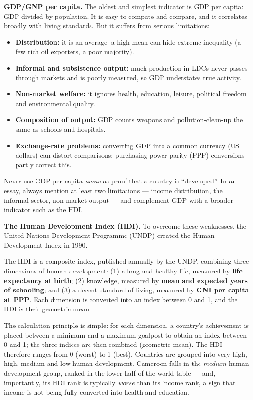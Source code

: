 \documentclass[11pt]{article}
\newcommand{\cle}[1]{{\popxbold\color{popdark}#1}}
\begin{document}
\textbf{GDP/GNP per capita.} The oldest and simplest indicator is \cle{GDP per capita}: GDP divided by population. It is easy to compute and compare, and it correlates broadly with living standards. But it suffers from serious limitations:
\begin{itemize}
\item \textbf{Distribution:} it is an average; a high mean can hide extreme inequality (a few rich oil exporters, a poor majority).
\item \textbf{Informal and subsistence output:} much production in LDCs never passes through markets and is poorly measured, so GDP understates true activity.
\item \textbf{Non-market welfare:} it ignores health, education, leisure, political freedom and environmental quality.
\item \textbf{Composition of output:} GDP counts weapons and pollution-clean-up the same as schools and hospitals.
\item \textbf{Exchange-rate problems:} converting GDP into a common currency (US dollars) can distort comparisons; purchasing-power-parity (PPP) conversions partly correct this.
\end{itemize}

\begin{attention}
Never use GDP per capita \emph{alone} as proof that a country is ``developed''. In an essay, always mention at least two limitations — income distribution, the informal sector, non-market output — and complement GDP with a broader indicator such as the HDI.
\end{attention}

\textbf{The Human Development Index (HDI).} To overcome these weaknesses, the United Nations Development Programme (UNDP) created the \cle{Human Development Index} in 1990.

\begin{definition}
The \cle{HDI} is a composite index, published annually by the UNDP, combining three dimensions of human development: (1) a long and healthy life, measured by \textbf{life expectancy at birth}; (2) knowledge, measured by \textbf{mean and expected years of schooling}; and (3) a decent standard of living, measured by \textbf{GNI per capita at PPP}. Each dimension is converted into an index between 0 and 1, and the HDI is their geometric mean.
\end{definition}

The calculation principle is simple: for each dimension, a country's achievement is placed between a minimum and a maximum goalpost to obtain an index between 0 and 1; the three indices are then combined (geometric mean). The HDI therefore ranges from 0 (worst) to 1 (best). Countries are grouped into very high, high, medium and low human development. Cameroon falls in the \emph{medium} human development group, ranked in the lower half of the world table — and, importantly, its HDI rank is typically \emph{worse} than its income rank, a sign that income is not being fully converted into health and education.
\end{document}
